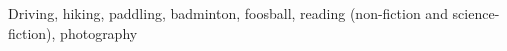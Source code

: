 

\begin{cvparagraph}
{Driving, hiking, paddling, badminton, foosball, reading (non-fiction and science-fiction), photography}
\end{cvparagraph}
